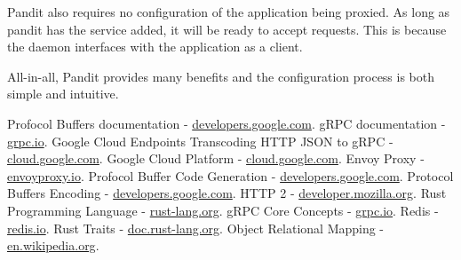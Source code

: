 \documentclass[a4paper]{article}
\begin{document}
Pandit also requires no configuration of the application being proxied. As long as pandit has the service added, it will be ready to accept requests.
This is because the daemon interfaces with the application as a client.

All-in-all, Pandit provides many benefits and the configuration process is both simple and intuitive.

\begin{thebibliography}{9}
    Profocol Buffers documentation - \href{https://developers.google.com/protocol-buffers}{developers.google.com}.
    gRPC documentation - \href{https://grpc.io/docs/}{grpc.io}.
    Google Cloud Endpoints Transcoding HTTP JSON to gRPC - \href{https://cloud.google.com/endpoints/docs/grpc/transcoding}{cloud.google.com}.
    Google Cloud Platform - \href{https://cloud.google.com/}{cloud.google.com}.
    Envoy Proxy - \href{https://www.envoyproxy.io/docs/envoy/latest/intro/arch_overview/arch_overview}{envoyproxy.io}.
    Profocol Buffer Code Generation - \href{https://developers.google.com/protocol-buffers/docs/reference/go-generated}{developers.google.com}.
    Protocol Buffers Encoding - \href{https://developers.google.com/protocol-buffers/docs/encoding}{developers.google.com}.
    HTTP 2 - \href{https://developer.mozilla.org/en-US/docs/Glossary/HTTP_2}{developer.mozilla.org}.
    Rust Programming Language - \href{https://www.rust-lang.org/}{rust-lang.org}.
    gRPC Core Concepts - \href{https://grpc.io/docs/what-is-grpc/core-concepts/}{grpc.io}.
    Redis - \href{https://redis.io/}{redis.io}.
    Rust Traits - \href{https://doc.rust-lang.org/rust-by-example/trait.html}{doc.rust-lang.org}.
    Object Relational Mapping - \href{https://en.wikipedia.org/wiki/Object%E2%80%93relational_mapping}{en.wikipedia.org}.
\end{thebibliography}
\end{document}
